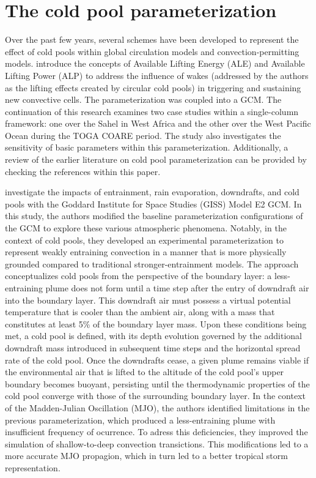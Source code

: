 \section{The cold pool parameterization}
\label{section23}

Over the past few years, several schemes have been developed to represent the effect of cold pools within global circulation models and convection-permitting models.  introduce the concepts of Available Lifting 
Energy (ALE) and Available Lifting Power (ALP) to address the influence of wakes (addressed by the authors as the lifting effects created by circular cold pools) in triggering and sustaining new convective cells. The parameterization was coupled into a GCM. The continuation of this research \cite{grandpeix2010density2} examines two case studies within a single-column framework: one over the Sahel in West Africa and the other over the West Pacific Ocean during the TOGA COARE period. The study also investigates the sensitivity of basic parameters within this parameterization. Additionally, a review of the earlier literature on cold pool parameterization can be provided by checking the references within this paper.

 investigate the impacts of entrainment, rain evaporation, downdrafts, and cold pools with the Goddard Institute for Space Studies (GISS) Model E2 GCM. In this study, the authors modified the baseline parameterization configurations of the GCM to explore these various atmospheric phenomena. Notably, in the context of cold pools, they developed an experimental parameterization to represent weakly entraining convection in a manner that is more physically grounded compared to traditional stronger-entrainment models. The approach conceptualizes cold pools from the perspective of the boundary layer: a less-entraining plume does not form until a time step after the entry of downdraft air into the boundary layer. This downdraft air must possess a virtual potential temperature that is cooler than the ambient air, along with a mass that constitutes at least 5\% of the boundary layer mass. Upon these conditions being met, a cold pool is defined, with its depth evolution governed by the additional downdraft mass introduced in subsequent time steps and the horizontal spread rate of the cold pool. Once the downdrafts cease, a given plume remains viable if the environmental air that is lifted to the altitude of the cold pool's upper boundary becomes buoyant, persisting until the thermodynamic properties of the cold pool converge with those of the surrounding boundary layer. In the context of the Madden-Julian Oscillation (MJO), the authors identified limitations in the previous parameterization, which produced a less-entraining plume with insufficient frequency of ocurrence. To adress this deficiencies, they improved the simulation of shallow-to-deep convection transictions. This modifications led to a more accurate MJO propagion, which in turn led to a better tropical storm representation.

